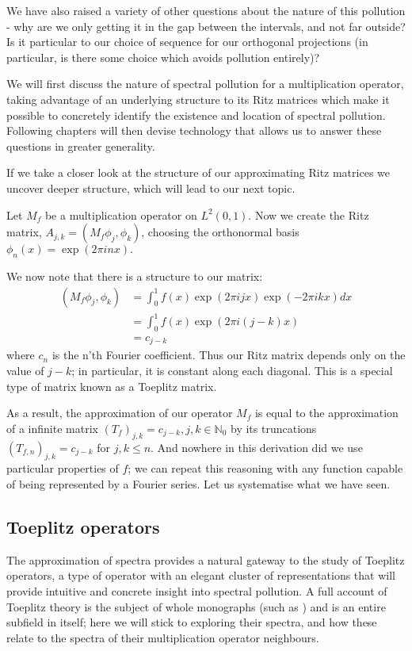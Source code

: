 \documentclass[../main.tex]{subfiles}
\begin{document}
We have also raised a variety of other questions about the nature of this pollution - why are we only getting it in the gap between the intervals, and not far outside? Is it particular to our choice of sequence for our orthogonal projections (in particular, is there some choice which avoids pollution entirely)?

We will first discuss the nature of spectral pollution for a multiplication operator, taking advantage of an underlying structure to its Ritz matrices which 
make it possible to concretely identify the existence and location of spectral pollution. Following chapters will then devise technology that allows us to 
answer these questions in greater generality.

If we take a closer look at the structure of our approximating Ritz matrices we uncover deeper structure, which will lead
to our next topic.
\begin{example}\label{exp:mult-op-toeplitz}
Let $M_f$ be a multiplication operator on $L^2(0, 1)$. Now we create the Ritz matrix, $A_{j,k} = (M_f \phi_j, \phi_k)$, 
choosing the orthonormal basis $\phi_n(x) = \exp(2 \pi i n x).$

We now note that there is a structure to our matrix:
\begin{align*}
(M_f \phi_j, \phi_k) & = \int_0^1 f(x) \exp(2 \pi i j x) \exp(-2 \pi i k x) dx \\
& = \int_0^1 f(x) \exp(2 \pi i (j-k) x)\\
& = c_{j-k}
\end{align*}
where $c_n$ is the n'th Fourier coefficient. Thus our Ritz matrix depends only on the value of $j-k$; in particular, it is constant
along each diagonal. This is a special type of matrix known as a Toeplitz matrix.
\end{example}
As a result, the approximation of our operator $M_f$ is equal to the approximation of a infinite matrix $(T_f)_{j,k} = c_{j-k},
j,k \in \mathbb{N}_0$ by its truncations $(T_{f,n})_{j,k} = c_{j-k}$ for $j, k \leq n$. And nowhere in this derivation did we use particular
properties of $f$; we can repeat this reasoning with any function capable of being represented by a Fourier series. Let us systematise
what we have seen.

\subsection{Toeplitz operators}\label{sec:toeplitz}

The approximation of spectra provides a natural gateway to the study of Toeplitz operators, a type of operator with an elegant cluster
of representations that will provide intuitive and concrete insight into spectral pollution. A full account of Toeplitz theory is the subject
of whole monographs (such as \parencite{bottcher1990analysis}) and is an entire subfield in itself;
here we will stick to exploring their spectra, and how these relate to the spectra of their multiplication operator neighbours. 
\end{document}
